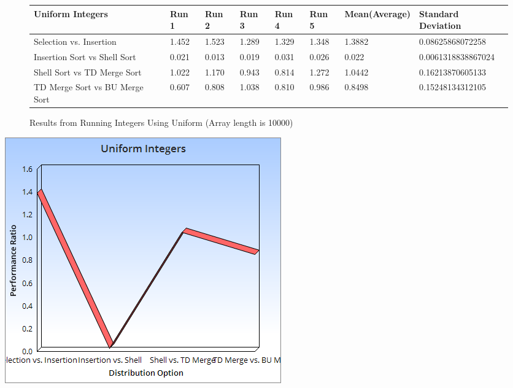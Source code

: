 \documentclass{article}
\begin{document}
\begin{figure}[H]
\centering
\begin{adjustwidth}{-3.4cm}{}
\begin{tabular}{| l | l | l | l | l | l | l | l |}
\hline
Uniform Integers & Run 1 & Run 2 & Run 3 & Run 4 & Run 5 & Mean(Average) & Standard Deviation\\ \hline
Selection vs. Insertion & 1.452 & 1.523 & 1.289 & 1.329 & 1.348 & 1.3882 & 0.08625868072258 \\ \hline
Insertion Sort vs Shell Sort & 0.021 & 0.013 & 0.019 & 0.031 & 0.026 & 0.022 &  0.0061318838867024 \\ \hline
Shell Sort vs TD Merge Sort & 1.022 & 1.170 & 0.943 & 0.814 & 1.272 & 1.0442 & 0.16213870605133\\ \hline
TD Merge Sort vs BU Merge Sort & 0.607 & 0.808 & 1.038 & 0.810 & 0.986 & 0.8498 & 0.15248134312105\\ \hline
\end{tabular}
\caption{Results from Running Integers Using Uniform (Array length is 10000)}
\end{adjustwidth}
\end{figure}
\includegraphics[scale=0.5]{UniformIntegers.png}
\end{document}
